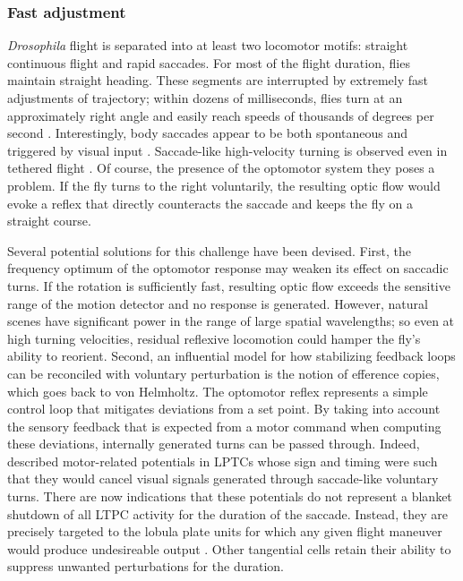 \subsubsection{Fast adjustment}
\textit{Drosophila} flight is separated into at least two locomotor motifs: straight continuous flight and rapid saccades. For most of the flight duration, flies maintain straight heading. These segments are interrupted by extremely fast adjustments of trajectory; within dozens of milliseconds, flies turn at an approximately right angle and easily reach speeds of thousands of degrees per second \citep{Mronz:2008eb,Straw:2011eua,Muijres:2014aa}. Interestingly, body saccades appear to be both spontaneous and triggered by visual input \citep{Tammero:2002aa,Mronz:2008eb,Censi:2013cya}. Saccade-like high-velocity turning is observed even in tethered flight \citep{Gotz:1968aa}. Of course, the presence of the optomotor system they poses a problem. If the fly turns to the right voluntarily, the resulting optic flow would evoke a reflex that directly counteracts the saccade and keeps the fly on a straight course.


Several potential solutions for this challenge have been devised. First, the frequency optimum of the optomotor response may weaken its effect on saccadic turns. If the rotation is sufficiently fast, resulting optic flow exceeds the sensitive range of the motion detector and no response is generated. However, natural scenes have significant power in the range of large spatial wavelengths; so even at high turning velocities, residual reflexive locomotion could hamper the fly's ability to reorient. Second, an influential model for how stabilizing feedback loops can be reconciled with voluntary perturbation is the notion of efference copies, which goes back to von Helmholtz. The optomotor reflex represents a simple control loop that mitigates deviations from a set point. By taking into account the sensory feedback that is expected from a motor command when computing these deviations, internally generated turns can be passed through. Indeed, \citet{Kim:2015kr} described motor-related potentials in LPTCs whose sign and timing were such that they would cancel visual signals generated through saccade-like voluntary turns. There are now indications that these potentials do not represent a blanket shutdown of all LTPC activity for the duration of the saccade. Instead, they are precisely targeted to the lobula plate units for which any given flight maneuver would produce undesireable output \citep{Kim:2017aa}. Other tangential cells retain their ability to suppress unwanted perturbations for the duration.

